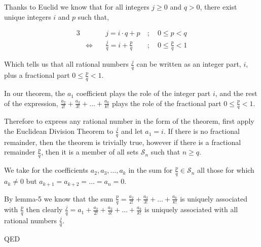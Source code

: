 \documentclass{article}
\begin{document}
Thanks to Euclid we know that for all integers \(j\ge{}0\) and \(q>0\),
there exist unique integers \(i\) and \(p\) such that,

{\normalsize
\bgroup                                  %
\setlength{\abovedisplayskip}{0pt}       %
\begin{alignat*}{3}
&&j = i\cdot{}q + p\ &;\quad 0\le{}p<q \\
&\Leftrightarrow\quad &\frac{j}{q} = i + \frac{p}{q}\ &;\quad 0\le{}\frac{p}{q}<1
\end{alignat*}
\egroup
}

Which tells us that all rational numbers \(\frac{j}{q}\) can be written as
an integer part, \(i\), plus a fractional part \(0\le{}\frac{p}{q}<1\).

In our theorem, the \(a_1\) coefficient plays the role of the integer part \(i\),
and the rest of the expression, \(\frac{a_2}{2!} + \frac{a_3}{3!} + \dots{} + \frac{a_k}{k!}\)
plays the role of the fractional part \(0\le{}\frac{p}{q}<1\).

Therefore to express any rational number in the form of the theorem, first apply the
Euclidean Division Theorem to \(\frac{j}{q}\) and let \(a_1 = i\). If there is no fractional remainder, then
the theorem is trivially true,
however if there is a fractional remainder \(\frac{p}{q}\), then it is a member of all sets \(\mathcal{S}_n\)
such that \(n \ge{} q\).

We take for the coefficients \(a_2, a_3, \dots{}, a_k\) in the sum for \(\frac{p}{q} \in{} \mathcal{S}_n\)
all those for which \(a_k \ne{} 0\) but \(a_{k+1} = a_{k+2} = \dots{} = a_n = 0\).

By lemma-5 we know that the sum \(\frac{p}{q} = \frac{a_2}{2!} + \frac{a_3}{3!} + \dots{} + \frac{a_k}{k!}\) is
uniquely associated
with \(\frac{p}{q}\)
then clearly \(\frac{j}{q} = a_1 + \frac{a_2}{2!} + \frac{a_3}{3!} + \dots{} + \frac{a_k}{k!}\)
is uniquely associated with all rational numbers \(\frac{j}{q}\).

QED
\end{document}
